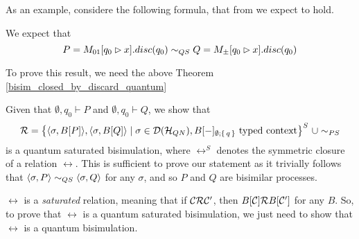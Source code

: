 As an example, considere the following formula, that from \cite{davidsonFormalVerificationTechniques2012} we expect to hold.
\begin{example}
We expect that $$P =  M_{01}[q_0 \rhd x].disc(q_0) \sim_{QS} Q = M_\pm[q_0 \rhd x].disc(q_0)$$
\end{example}

To prove this result, we need the above Theorem \ref{bisim_closed_by_discard_quantum}

Given that $\emptyset, {q_0} \vdash P$ and $\emptyset, {q_0} \vdash Q$, we show that
\[\mathcal{R} = \big\{ \langle\sigma, B[P]\rangle, \langle\sigma, B[Q]\rangle \mid \sigma \in \mathcal{D}(\mathcal{H}_{QN}), B[{-}]_{\emptyset; \set{q}} \text{ typed context}\big\}^S\ \cup \sim_{PS}
\]
is a quantum saturated bisimulation, where $\rel^S$ denotes the symmetric closure of a relation $\rel$. This is sufficient to prove our statement as it trivially follows that $\langle\sigma, P\rangle \sim_{QS} \langle\sigma, Q\rangle$ for any $\sigma$, and so $P$ and $Q$ are bisimilar processes.

$\rel$ is a \textit{saturated} relation, meaning that if $\mathcal{C} \mathcal{R} \mathcal{C}'$, then $B[\mathcal{C}] \mathcal{R} B[\mathcal{C}']$ for any $B$. So, to prove that $\rel$ is a quantum saturated bisimulation, we just need to show that $\rel$ is a quantum bisimulation.

